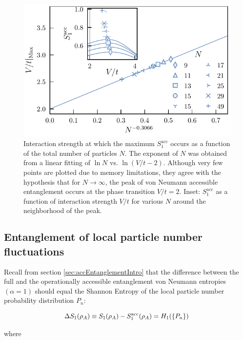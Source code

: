 \begin{figure}[htp]
\begin{center}
\includegraphics[width=1.0\columnwidth]{peakScalingOddN.pdf}
\end{center}
\caption{Interaction strength at which the maximum $S_{1}^{\mathrm{acc}}$ occurs as a function of the total number of particles $N$. The exponent of $N$ was obtained from a linear fitting of $\ln N$ vs. $\ln{(V/t - 2)}$.  Although very few points are plotted due to memory limitations, they agree with the hypothesis that for $N \to \infty$, the peak of von Neumann accessible entanglement occurs at the phase transition $V/t = 2$. Inset: $S_{1}^{\mathrm{acc}}$ as a function of interaction strength $V/t$ for various $N$ around the neighborhood of the peak.}
\label{fig:peakScalingOddN}
\end{figure}

\subsection{Entanglement of local particle number fluctuations}

Recall from section \ref{sec:accEntanglementIntro} that the difference between the full and the operationally accessible entanglement von Neumann entropies $\left( \alpha = 1 \right)$ should equal the Shannon Entropy of the local particle number probability distribution $P_n$:

%
\begin{equation}
    \Delta S_1 (\rho_A) \equiv S_1(\rho_A) - S_1^{\rm acc}(\rho_A) = H_1(\{P_n\})
    \label{eq:DeltaS1}
\end{equation}
%

where

